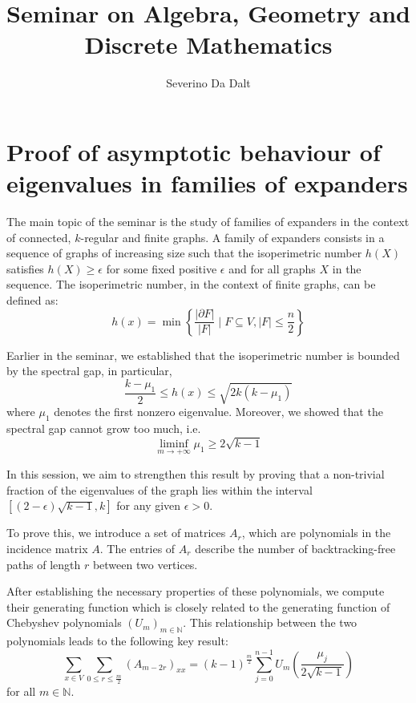 \documentclass[11pt]{article}
\title{Seminar on Algebra, Geometry and Discrete Mathematics}
\author{Severino Da Dalt}
\theoremstyle{definition}
\begin{document}
    \maketitle

    \section{Proof of asymptotic behaviour of eigenvalues in families of expanders}\label{sec:section}
    The main topic of the seminar is the study of families of expanders in the context of connected, $k$-regular and finite graphs.
    A family of expanders consists in a sequence of graphs of increasing size such that the isoperimetric number $h(X)$ satisfies $h(X) \geq \epsilon$
    for some fixed positive $\epsilon$ and for all graphs $X$ in the sequence.
    The isoperimetric number, in the context of finite graphs, can be defined as:
    $$h(x) = \min{ \left\{ \frac{|\partial F|}{|F|} \mid F \subseteq V, |F| \leq \frac{n}{2}\right\} }$$

    Earlier in the seminar, we established that the isoperimetric number is bounded by the spectral gap, in particular,
    $$\frac{k - \mu_1}{2} \leq h(x) \leq \sqrt{2k(k - \mu_1)}$$
    where $\mu_1$ denotes the first nonzero eigenvalue.
    Moreover, we showed that the spectral gap cannot grow too much, i.e.
    $$\liminf\limits_{m \rightarrow +\infty}\mu_1 \geq 2 \sqrt{k-1}$$

    In this session, we aim to strengthen this result by proving that a non-trivial fraction of the eigenvalues of the
    graph lies within the interval $[(2 - \epsilon) \sqrt{k-1}, k]$ for any given $\epsilon > 0$.
    \newline

    To prove this, we introduce a set of matrices $A_r$, which are polynomials in the incidence matrix $A$.
    The entries of $A_r$ describe the number of backtracking-free paths of length $r$ between two vertices.
    \newline

    After establishing the necessary properties of these polynomials, we compute their generating function which
    is closely related to the generating function of Chebyshev polynomials $(U_m)_{m\in \mathbb{N}}$.
    This relationship between the two polynomials leads to the following key result:
    \begin{equation}
        \label{eq:1}
        \sum_{x \in V} \sum_{0\leq r \leq\frac{m}{2}} \left(A_{m-2r}\right)_{xx} = (k-1)^{\frac{m}{2}} \sum_{j=0}^{n-1} U_m\left(\frac{\mu_j}{2\sqrt{k-1}}\right)
    \end{equation}
    for all $m \in \mathbb{N}$.
    \newline
\end{document}
